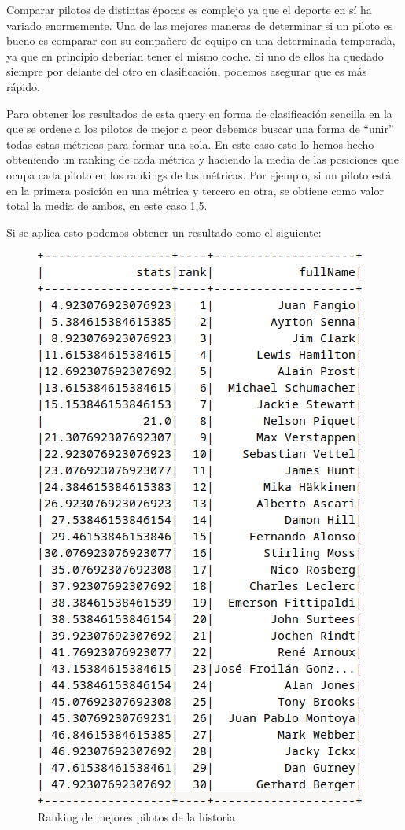 \documentclass[12pt,twoside,titlepage]{report}
\newcommand{\quotes}[1]{``#1''}
\begin{document}
Comparar pilotos de distintas épocas es complejo ya que el deporte en sí ha variado enormemente. Una de las mejores maneras de determinar si un piloto es bueno es comparar con su compañero de equipo en una determinada temporada, ya que en principio deberían tener el mismo coche. Si uno de ellos ha quedado siempre por delante del otro en clasificación, podemos asegurar que es más rápido.

Para obtener los resultados de esta query en forma de clasificación sencilla en la que se ordene a los pilotos de mejor a peor debemos buscar una forma de \quotes{unir} todas estas métricas para formar una sola. En este caso esto lo hemos hecho obteniendo un ranking de cada métrica y haciendo la media de las posiciones que ocupa cada piloto en los rankings de las métricas. Por ejemplo, si un piloto está en la primera posición en una métrica y tercero en otra, se obtiene como valor total la media de ambos, en este caso 1,5.

Si se aplica esto podemos obtener un resultado como el siguiente:

\begin{figure}[H]
	\includegraphics[scale=0.3]{results/bestdrivers/bestdrivers.png}
	\centering
	\caption{Ranking de mejores pilotos de la historia}
	\label{fig:bestDrivers}
	\centering
\end{figure}
\end{document}
